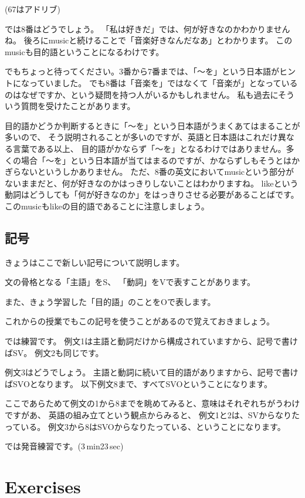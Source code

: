 \documentclass[book,jafontscale=0.9247]{jlreq}
\begin{document}
(67はアドリブ)

では8番はどうでしょう。
「私は好きだ」では、何が好きなのかわかりませんね。
後ろにmusicと続けることで「音楽好きなんだなあ」とわかります。
このmusicも目的語ということになるわけです。

でもちょっと待ってください。3番から7番までは、「～を」という日本語がヒントになっていました。
でも8番は「音楽を」ではなくて「音楽が」となっているのはなぜですか、という疑問を持つ人がいるかもしれません。
私も過去にそういう質問を受けたことがあります。

目的語かどうか判断するときに「～を」という日本語がうまくあてはまることが多いので、
そう説明されることが多いのですが、英語と日本語はこれだけ異なる言葉である以上、
目的語がかならず「～を」となるわけではありません。多くの場合「～を」という日本語が当てはまるのですが、かならずしもそうとはかぎらないというしかありません。
ただ、8番の英文においてmusicという部分がないままだと、何が好きなのかはっきりしないことはわかりますね。
likeという動詞はどうしても「何が好きなのか」をはっきりさせる必要があることばです。
このmusicもlikeの目的語であることに注意しましょう。

\subsection{記号}

きょうはここで新しい記号について説明します。

文の骨格となる「主語」をS、
「動詞」をVで表すことがあります。

また、きょう学習した「目的語」のことをOで表します。


これからの授業でもこの記号を使うことがあるので覚えておきましょう。

では練習です。
例文1は主語と動詞だけから構成されていますから、記号で書けばSV。
例文2も同じです。

例文3はどうでしょう。
主語と動詞に続いて目的語がありますから、記号で書けばSVOとなります。
以下例文8まで、すべてSVOということになります。


ここであらためて例文の1から8までを眺めてみると、意味はそれぞれちがうわけですがあ、
英語の組み立てという観点からみると、
例文1と2は、SVからなりたっている。
例文3から8はSVOからなりたっている、ということになります。

では発音練習です。\faVolumeUp(3\,min23\,sec)

\section{Exercises}
\end{document}
